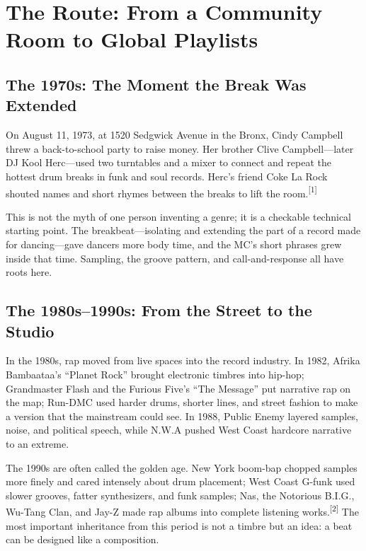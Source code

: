 \section{The Route: From a Community Room to Global Playlists}
\label{sec:hiphop-history}

\subsection{The 1970s: The Moment the Break Was Extended}
\label{sec:hiphop-history-1970s}

On August 11, 1973, at 1520 Sedgwick Avenue in the Bronx, Cindy Campbell threw a back-to-school party to raise money. Her brother Clive Campbell---later DJ Kool Herc---used two turntables and a mixer to connect and repeat the hottest drum breaks in funk and soul records. Herc's friend Coke La Rock shouted names and short rhymes between the breaks to lift the room.{\textsuperscript{[1]}}

This is not the myth of one person inventing a genre; it is a checkable technical starting point. The breakbeat---isolating and extending the part of a record made for dancing---gave dancers more body time, and the MC's short phrases grew inside that time. Sampling, the groove pattern, and call-and-response all have roots here.

\subsection{The 1980s--1990s: From the Street to the Studio}
\label{sec:hiphop-history-1980s}

In the 1980s, rap moved from live spaces into the record industry. In 1982, Afrika Bambaataa's ``Planet Rock'' brought electronic timbres into hip-hop; Grandmaster Flash and the Furious Five's ``The Message'' put narrative rap on the map; Run-DMC used harder drums, shorter lines, and street fashion to make a version that the mainstream could see. In 1988, Public Enemy layered samples, noise, and political speech, while N.W.A pushed West Coast hardcore narrative to an extreme.

The 1990s are often called the golden age. New York boom-bap chopped samples more finely and cared intensely about drum placement; West Coast G-funk used slower grooves, fatter synthesizers, and funk samples; Nas, the Notorious B.I.G., Wu-Tang Clan, and Jay-Z made rap albums into complete listening works.{\textsuperscript{[2]}} The most important inheritance from this period is not a timbre but an idea: a beat can be designed like a composition.

